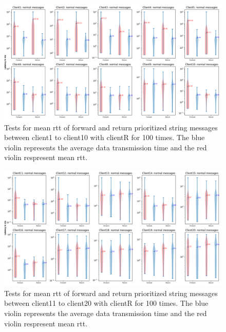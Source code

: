 


\begin{figure}
    \centering
    \includegraphics[width=\textheight]{figures/appendix/priority_tests/log_violin_50clients_string_figure_1.png}\hfill 
    \caption{Tests for mean \gls{rtt} of forward and return prioritized string messages between client1 to client10 
    with clientR for 100 times. The blue violin represents the average data transmission time and the red violin 
    respresent mean \gls{rtt}.} \label{fig: priority-50clients-string-a}
\end{figure}

\begin{figure}
    \includegraphics[width=\textheight]{figures/appendix/priority_tests/log_violin_50clients_string_figure_2.png}\hfill 
    \caption{Tests for mean \gls{rtt} of forward and return prioritized string messages between client11 to client20 
    with clientR for 100 times. The blue violin represents the average data transmission time and the red violin 
    respresent mean \gls{rtt}.} \label{fig: priority-50clients-string-b}
\end{figure}

